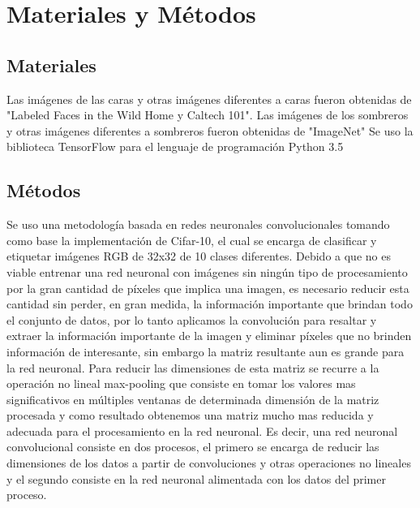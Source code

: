 \documentclass[10pt,twocolumn,letterpaper]{article}
\begin{document}

\section{Materiales y Métodos}
\subsection{Materiales}
Las imágenes de las caras y otras imágenes diferentes a caras fueron obtenidas de "Labeled Faces in the Wild Home y Caltech 101".
Las imágenes de los sombreros y otras imágenes diferentes a sombreros fueron obtenidas de "ImageNet"
Se uso la biblioteca TensorFlow para el lenguaje de programación Python 3.5

\subsection{Métodos}
Se uso una metodología basada en redes neuronales convolucionales tomando como base la implementación de Cifar-10, el cual se encarga de clasificar y etiquetar imágenes RGB de 32x32 de 10 clases diferentes. 
Debido a que no es viable entrenar una red neuronal con imágenes sin ningún tipo de procesamiento por la gran cantidad de píxeles que implica una imagen, es necesario reducir esta cantidad sin perder, en gran medida, la información importante que brindan todo el conjunto de datos, por lo tanto aplicamos la convolución para resaltar y extraer la información importante de la imagen y eliminar píxeles que no brinden información de interesante, sin embargo la matriz resultante aun es grande para la red neuronal. Para reducir las dimensiones de esta matriz se recurre a la operación no lineal max-pooling que consiste en tomar los valores mas significativos en múltiples ventanas de determinada dimensión de la matriz procesada y como resultado obtenemos una matriz mucho mas reducida y adecuada para el procesamiento en la red neuronal. Es decir, una red neuronal convolucional consiste en dos procesos, el primero se encarga de reducir las dimensiones de los datos a partir de convoluciones y otras operaciones no lineales y el segundo consiste en la red neuronal alimentada con los datos del primer proceso.
\end{document}
